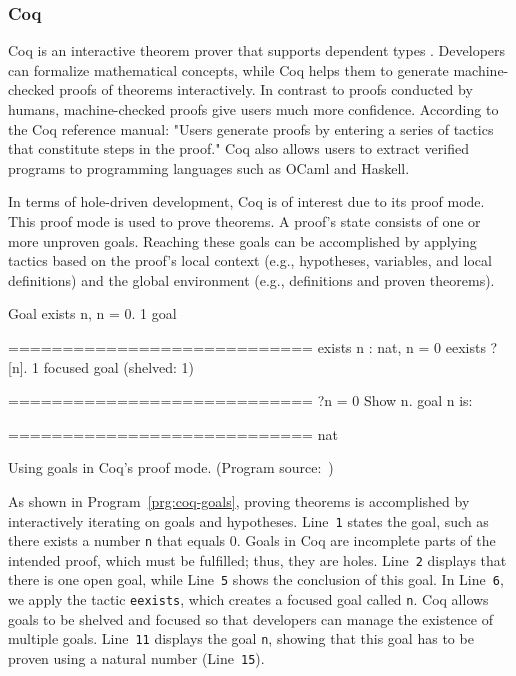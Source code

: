 \subsubsection{Coq}
Coq is an interactive theorem prover that supports dependent types \cite{the_coq_development_team_proof_2023}.
Developers can formalize mathematical concepts, while Coq helps them to generate machine-checked proofs of theorems interactively.
In contrast to proofs conducted by humans, machine-checked proofs give users much more confidence.
According to the Coq reference manual: "Users generate proofs by entering a series of tactics that constitute steps in the proof." \cite{the_coq_development_team_proof_2023}
Coq also allows users to extract verified programs to programming languages such as OCaml and Haskell.

In terms of hole-driven development, Coq is of interest due to its proof mode.
This proof mode is used to prove theorems.
A proof's state consists of one or more unproven goals.
Reaching these goals can be accomplished by applying tactics \cite{redmon_coq_2021} based on the proof's local context (e.g., hypotheses, variables, and local definitions) and the global environment (e.g., definitions and proven theorems).

\begin{program}[ht]
\begin{GenericCode}
Goal exists n, n = 0.
    1 goal
      
      ============================
      exists n : nat, n = 0
eexists ?[n].
    1 focused goal (shelved: 1)
      
      ============================
      ?n = 0
Show n.
    goal n is:
      
      ============================
      nat
\end{GenericCode}
\caption{Using goals in Coq's proof mode. (Program source:~\cite{the_coq_development_team_proof_2023})}
\label{prg:coq-goals}
\end{program}

As shown in Program~\ref{prg:coq-goals}, proving theorems is accomplished by interactively iterating on goals and hypotheses.
Line~\verb|1| states the goal, such as there exists a number \verb|n| that equals 0.
Goals in Coq are incomplete parts of the intended proof, which must be fulfilled; thus, they are holes.
Line~\verb|2| displays that there is one open goal, while Line~\verb|5| shows the conclusion of this goal.
In Line~\verb|6|, we apply the tactic \verb|eexists|, which creates a focused goal called \verb|n|.
Coq allows goals to be shelved and focused so that developers can manage the existence of multiple goals.
Line~\verb|11| displays the goal \verb|n|, showing that this goal has to be proven using a natural number (Line~\verb|15|).

